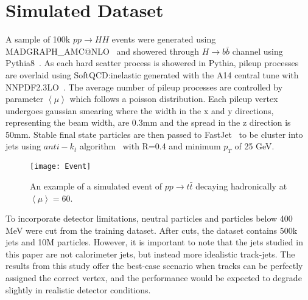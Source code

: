 \section{Simulated Dataset}\hfill

A sample of 100k $pp \rightarrow HH$ events were generated using MADGRAPH\_AMC@NLO~\cite{Alwall_2014} and showered through $H \rightarrow b\bar{b}$ channel using Pythia8~\cite{bierlich2022comprehensiveguidephysicsusage}. As each hard scatter process is showered in Pythia, pileup processes are overlaid using SoftQCD:inelastic generated with the A14 central tune with NNPDF2.3LO~\cite{bierlich2022comprehensiveguidephysicsusage}. The average number of pileup processes are controlled by parameter $\left<\mu\right>$ which follows a poisson distribution. Each pileup vertex undergoes gaussian smearing where the width in the x and y directions, representing the beam width, are 0.3mm and the spread in the z direction is 50mm. Stable final state particles are then passed to FastJet~\cite{Cacciari_2012} to be cluster into jets using $anti-k_t$ algorithm~\cite{Cacciari_2008} with R=0.4 and minimum $p_T$ of 25 GeV. \\

\begin{figure}[h]
\centering
\texttt{[image: Event]}
\caption{An example of a simulated event of $pp \rightarrow t\bar{t}$ decaying hadronically at $\left< \mu \right> =60$.}
\end{figure}

To incorporate detector limitations, neutral particles and particles below 400 MeV were cut from the training dataset. After cuts, the dataset contains 500k jets and 10M particles. However, it is important to note that the jets studied in this paper are not calorimeter jets, but instead more idealistic track-jets. The results from this study offer the best-case scenario when tracks can be perfectly assigned the correct vertex, and the performance would be expected to degrade slightly in realistic detector conditions.